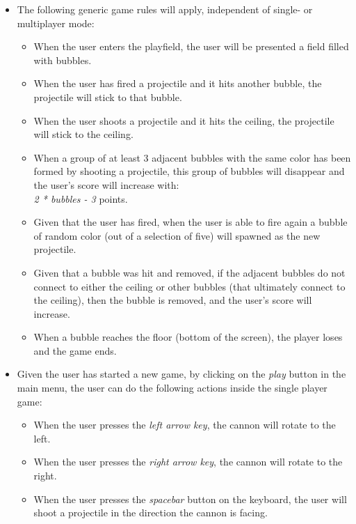 \documentclass[a4paper,11pt]{article}
\begin{document}
\begin{itemize}
  \item The following generic game rules will apply,
        independent of single- or multiplayer mode:
  \begin{itemize}
    \item When the user enters the playfield,
          the user will be presented a field filled with bubbles.
    \item When the user has fired a projectile and it hits another bubble,
          the projectile will stick to that bubble.
    \item When the user shoots a projectile and it hits the ceiling,
          the projectile will stick to the ceiling.
    \item When a group of at least 3 adjacent bubbles with the same color
          has been formed by shooting a projectile,
          this group of bubbles will disappear and the user's score will increase with: \\
          \textit{2 * bubbles - 3} points.
    \item Given that the user has fired,
          when the user is able to fire again a bubble of random color
          (out of a selection of five) will spawned as the new projectile.
    \item Given that a bubble was hit and removed,
          if the adjacent bubbles do not connect to either the ceiling or
          other bubbles (that ultimately connect to the ceiling),
          then the bubble is removed, and the user's score will increase.
    \item When a bubble reaches the floor (bottom of the screen),
          the player loses and the game ends.
  \end{itemize}

  \newpage
  \item Given the user has started a new game,
        by clicking on the \textit{play} button in the main menu,
        the user can do the following actions inside the single player game:
  \begin{itemize}
    \item When the user presses the \textit{left arrow key},
          the cannon will rotate to the left.
    \item When the user presses the \textit{right arrow key},
          the cannon will rotate to the right.
    \item When the user presses the \textit{spacebar} button on the keyboard,
          the user will shoot a projectile in the direction the cannon is facing.
  \end{itemize}


\end{itemize}
\end{document}

